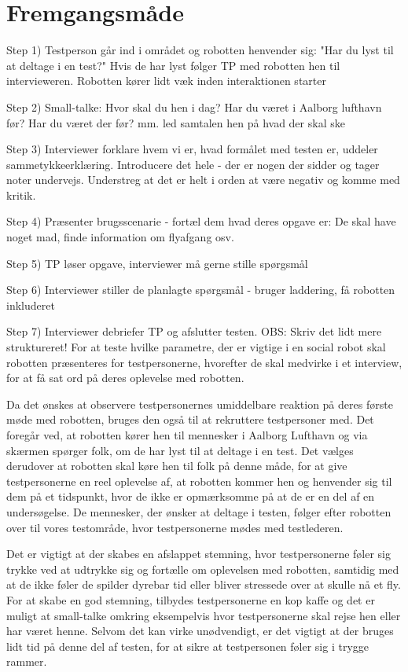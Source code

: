 \section{Fremgangsmåde}
\label{ParametreFremgangsmaade}
%
Step 1) Testperson går ind i området og robotten henvender sig: "Har du lyst til at deltage i en test?" Hvis de har lyst følger TP med robotten hen til intervieweren. Robotten kører lidt væk inden interaktionen starter

Step 2) Small-talke: Hvor skal du hen i dag? Har du været i Aalborg lufthavn før? Har du været der før? mm. led samtalen hen på hvad der skal ske

Step 3) Interviewer forklare hvem vi er, hvad formålet med testen er, uddeler sammetykkeerklæring. Introducere det hele - der er nogen der sidder og tager noter undervejs. Understreg at det er helt i orden at være negativ og komme med kritik. 

Step 4) Præsenter brugsscenarie - fortæl dem hvad deres opgave er: De skal have noget mad, finde information om flyafgang osv. 

Step 5) TP løser opgave, interviewer må gerne stille spørgsmål 

Step 6) Interviewer stiller de planlagte spørgsmål - bruger laddering, få robotten inkluderet

Step 7) Interviewer debriefer TP og afslutter testen. \blankline
%
OBS: Skriv det lidt mere struktureret!\blankline
%
For at teste hvilke parametre, der er vigtige i en social robot skal robotten præsenteres for testpersonerne, hvorefter de skal medvirke i et interview, for at få sat ord på deres oplevelse med robotten. 

Da det ønskes at observere testpersonernes umiddelbare reaktion på deres første møde med robotten, bruges den også til at rekruttere testpersoner med. Det foregår ved, at robotten kører hen til mennesker i Aalborg Lufthavn og via skærmen spørger folk, om de har lyst til at deltage i en test. Det vælges derudover at robotten skal køre hen til folk på denne måde, for at give testpersonerne en reel oplevelse af, at robotten kommer hen og henvender sig til dem på et tidspunkt, hvor de ikke er opmærksomme på at de er en del af en undersøgelse. De mennesker, der ønsker at deltage i testen, følger efter robotten over til vores testområde, hvor testpersonerne mødes med testlederen.\blankline

Det er vigtigt at der skabes en afslappet stemning, hvor testpersonerne føler sig trykke ved at udtrykke sig og fortælle om oplevelsen med robotten, samtidig med at de ikke føler de spilder dyrebar tid eller bliver stressede over at skulle nå et fly. For at skabe en god stemning, tilbydes testpersonerne en kop kaffe og det er muligt at small-talke omkring eksempelvis hvor testpersonerne skal rejse hen eller har været henne. Selvom det kan virke unødvendigt, er det vigtigt at der bruges lidt tid på denne del af testen, for at sikre at testpersonen føler sig i trygge rammer. 

